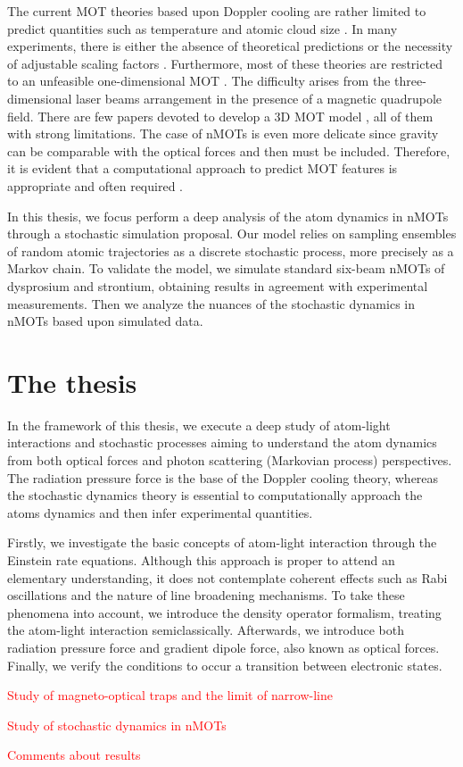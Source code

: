 The current MOT theories based upon Doppler cooling are rather limited to predict quantities such as temperature \cite{lett1988observation} and atomic cloud size \cite{gattobigio2010scaling}. In many experiments, there is either the absence of theoretical predictions or the necessity of adjustable scaling factors \cite{loo2003investigations}. Furthermore, most of these theories are restricted to an unfeasible one-dimensional MOT \cite{metcalf2007laser, balykin2000electromagnetic}. The difficulty arises from the three-dimensional laser beams arrangement in the presence of a magnetic quadrupole field. There are few papers devoted to develop a 3D MOT model \cite{prudnikov2015three}, all of them with strong limitations. The case of nMOTs is even more delicate since gravity can be comparable with the optical forces and then must be included. Therefore, it is evident that a computational approach to predict MOT features is appropriate and often required \cite{chaudhuri2006realization, atutov2001sodium,hanley2018quantitative}.

In this thesis, we focus perform a deep analysis of the atom dynamics in nMOTs through a stochastic simulation proposal. Our model relies on sampling ensembles of random atomic trajectories as a discrete stochastic process, more precisely as a Markov chain. To validate the model, we simulate standard six-beam nMOTs of dysprosium and strontium, obtaining results in agreement with experimental measurements. Then we analyze the nuances of the stochastic dynamics in nMOTs based upon simulated data.

\section{The thesis}
\label{sec:introduction-thesis}

In the framework of this thesis, we execute a deep study of atom-light interactions and stochastic processes aiming to understand the atom dynamics from both optical forces and photon scattering (Markovian process) perspectives. The radiation pressure force is the base of the Doppler cooling theory, whereas the stochastic dynamics theory is essential to computationally approach the atoms dynamics and then infer experimental quantities.

Firstly, we investigate the basic concepts of atom-light interaction through the Einstein rate equations. Although this approach is proper to attend an elementary understanding, it does not contemplate coherent effects such as Rabi oscillations and the nature of line broadening mechanisms. To take these phenomena into account, we introduce the density operator formalism, treating the atom-light interaction semiclassically. Afterwards, we introduce both radiation pressure force and gradient dipole force, also known as optical forces. Finally, we verify the conditions to occur a transition between electronic states.

\textcolor{red}{Study of magneto-optical traps and the limit of narrow-line}

\textcolor{red}{Study of stochastic dynamics in nMOTs}

\textcolor{red}{Comments about results}
